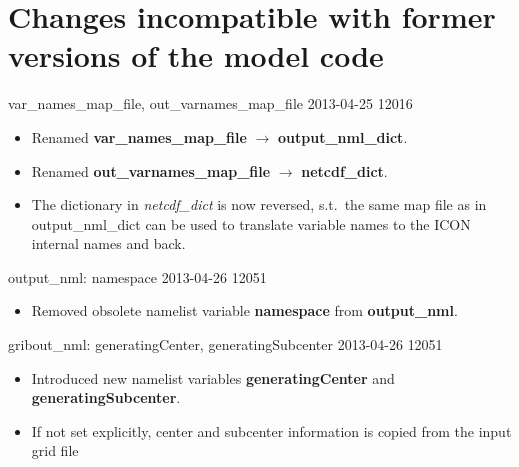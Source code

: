 \section{Changes incompatible with former versions of the model code}
\noindent
%

\begin{changeitem}{ var\_names\_map\_file, out\_varnames\_map\_file }{ 2013-04-25 }{ 12016 }
  \begin{itemize}
   \item Renamed \textbf{var\_names\_map\_file} $\rightarrow$ \textbf{output\_nml\_dict}.
   \item Renamed \textbf{out\_varnames\_map\_file} $\rightarrow$ \textbf{netcdf\_dict}.
   \item The dictionary in \emph{netcdf\_dict} is now reversed, s.t.\ the same map file
         as in output\_nml\_dict can be used to translate variable names to the ICON internal
         names and back.
  \end{itemize}
\end{changeitem}


\begin{changeitem}{output\_nml: namespace}{ 2013-04-26 }{ 12051 }
  \begin{itemize}
   \item Removed obsolete namelist variable \textbf{namespace} from \textbf{output\_nml}.
  \end{itemize}
\end{changeitem}

\begin{changeitem}{gribout\_nml: generatingCenter, generatingSubcenter}{ 2013-04-26 }{ 12051 }
  \begin{itemize}
   \item Introduced new namelist variables \textbf{generatingCenter} and \textbf{generatingSubcenter}.
   \item If not set explicitly, center and subcenter information is copied from the input grid file
  \end{itemize}
\end{changeitem}

